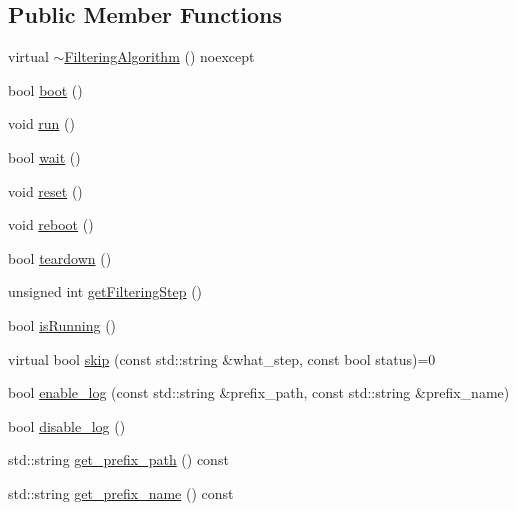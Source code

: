 \subsection*{Public Member Functions}
\begin{DoxyCompactItemize}
\item 
virtual \mbox{\hyperlink{classbfl_1_1FilteringAlgorithm_ab286cc00b054717679fb13a3b709b1c4}{$\sim$\+Filtering\+Algorithm}} () noexcept
\item 
bool \mbox{\hyperlink{classbfl_1_1FilteringAlgorithm_a96651f8464190c0a56d79219a1017147}{boot}} ()
\item 
void \mbox{\hyperlink{classbfl_1_1FilteringAlgorithm_a009cbe5f4bbb16967f6c6ddcaed8fbb1}{run}} ()
\item 
bool \mbox{\hyperlink{classbfl_1_1FilteringAlgorithm_a40372c24fa050eb0274371172df0a244}{wait}} ()
\item 
void \mbox{\hyperlink{classbfl_1_1FilteringAlgorithm_a2403c62fbd7bd7f5cda56a84f5f30331}{reset}} ()
\item 
void \mbox{\hyperlink{classbfl_1_1FilteringAlgorithm_a6022859aa985474fb997343cc935b11e}{reboot}} ()
\item 
bool \mbox{\hyperlink{classbfl_1_1FilteringAlgorithm_a1dc912d89ee8f96d4f3e8209865c5308}{teardown}} ()
\item 
unsigned int \mbox{\hyperlink{classbfl_1_1FilteringAlgorithm_a8c43b1f3dac30934c0a03de348d4a29d}{get\+Filtering\+Step}} ()
\item 
bool \mbox{\hyperlink{classbfl_1_1FilteringAlgorithm_a5cfecab2c778620e2557237472bb1721}{is\+Running}} ()
\item 
virtual bool \mbox{\hyperlink{classbfl_1_1FilteringAlgorithm_ac8a718a614905d89d6a43bbbc70d68b2}{skip}} (const std\+::string \&what\+\_\+step, const bool status)=0
\item 
bool \mbox{\hyperlink{classbfl_1_1Logger_ae94b97b6e8d7902e8ce048384813122e}{enable\+\_\+log}} (const std\+::string \&prefix\+\_\+path, const std\+::string \&prefix\+\_\+name)
\item 
bool \mbox{\hyperlink{classbfl_1_1Logger_a440467a28ccc46490d767fe0ef6f556a}{disable\+\_\+log}} ()
\item 
std\+::string \mbox{\hyperlink{classbfl_1_1Logger_a56cf1a4e712bf23d9978420a8a59a62b}{get\+\_\+prefix\+\_\+path}} () const
\item 
std\+::string \mbox{\hyperlink{classbfl_1_1Logger_a913a795b7bfbf378815eeb342d68a7c0}{get\+\_\+prefix\+\_\+name}} () const
\item 

\end{DoxyCompactItemize}
